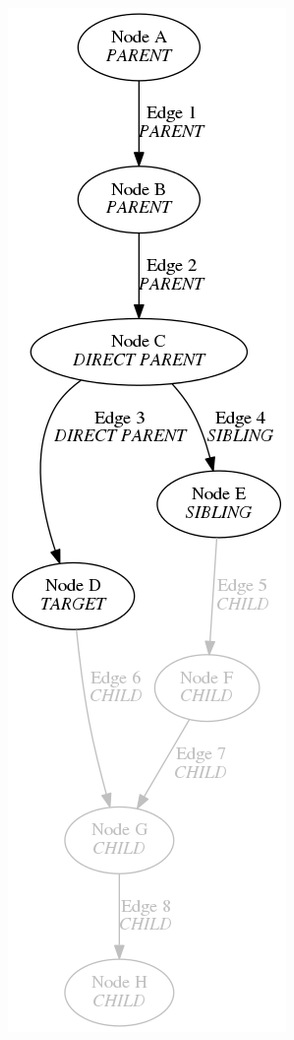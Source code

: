 \begin{figure}
    \centering
    \begin{subfigure}{0.4\textwidth}
        \centering
        \includegraphics[height=.6\textheight]{img/examplemap_partial_d.png}

\end{subfigure}
\end{figure}
